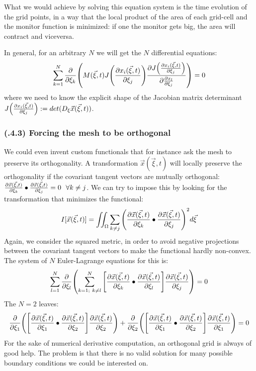 \documentclass[11pt, a4paper]{article} %
\begin{document}
What we would achieve by solving this equation system is the time evolution of the grid points, in a way that the local product of the area of each grid-cell and the monitor function is minimized: if one the monitor gets big, the area will contract and viceversa.

In general, for an arbitrary $N$ we will get the $N$ differential equations:
\begin{equation}
\sum_{k=1}^N \pdv{}{\xi_k} \qty( M(\vec{\xi},t) J\qty(\pdv{x_i(\vec{\xi},t)}{\xi_j}) \pdv{J\qty(\pdv{x_i(\vec{\xi},t)}{\xi_j}) }{\pdv{x_l}{\xi_j}} )=0
\end{equation}
where we need to know the explicit shape of the Jacobian matrix determinant $J\qty(\pdv{x_i(\vec{\xi},t)}{\xi_j}):=det(D_\xi \vec{x}(\vec{\xi},t))$.

\subsubsection*{\bf (\textgamma.4.3) Forcing the mesh to be orthogonal}
We could even invent custom functionals that for instance ask the mesh to preserve its orthogonality. A transformation $\vec{x}(\vec{\xi},t)$ will locally preserve the orthogonality if the covariant tangent vectors are mutually orthogonal: $\pdv{\vec{x}(\vec{\xi},t)}{\xi_k}\bullet \pdv{\vec{x}(\vec{\xi},t)}{\xi_j}=0\ \ \forall k\neq j$. We can try to impose this by looking for the transformation that minimizes the functional:
\begin{equation}
I[\vec{x}(\vec{\xi},t)]=\iint_\Omega \sum_{k\neq j} \qty(\pdv{\vec{x}(\vec{\xi},t)}{\xi_k}\bullet \pdv{\vec{x}(\vec{\xi},t)}{\xi_j})^2 d\vec{\xi}
\end{equation}
Again, we consider the squared metric, in order to avoid negative projections between the covariant tangent vectors to make the functional hardly non-convex.
The system of $N$ Euler-Lagrange equations for this is:
\begin{equation}
\sum_{l=1}^N \pdv{}{\xi_l}\qty( \sum_{k=1;\ k\neq l}^N \qty[\pdv{\vec{x}(\vec{\xi},t)}{\xi_k}\bullet \pdv{\vec{x}(\vec{\xi},t)}{\xi_l}] \pdv{\vec{x}(\vec{\xi},t)}{\xi_j}  )=0
\end{equation}
The $N=2$ leaves:
\begin{equation}
\pdv{}{\xi_1}\qty( \qty[\pdv{\vec{x}(\vec{\xi},t)}{\xi_1}\bullet \pdv{\vec{x}(\vec{\xi},t)}{\xi_2}] \pdv{\vec{x}(\vec{\xi},t)}{\xi_2}  )+\pdv{}{\xi_2}\qty( \qty[\pdv{\vec{x}(\vec{\xi},t)}{\xi_1}\bullet \pdv{\vec{x}(\vec{\xi},t)}{\xi_2}] \pdv{\vec{x}(\vec{\xi},t)}{\xi_1}  )=0
\end{equation}
For the sake of numerical derivative computation, an orthogonal grid is always of good help. The problem is that there is no valid solution for many possible boundary conditions we could be interested on.
\end{document}
